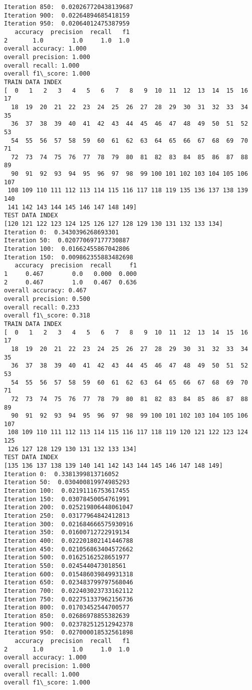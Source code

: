 \documentclass[11pt]{article}
\begin{document}
\begin{Verbatim}[commandchars=\\\{\}]
Iteration 850:  0.020267720438139687
Iteration 900:  0.02264894685418159
Iteration 950:  0.02064012475387959
   accuracy  precision  recall   f1
2       1.0        1.0     1.0  1.0
overall accuracy: 1.000
overall precision: 1.000
overall recall: 1.000
overall f1\_score: 1.000
TRAIN DATA INDEX
[  0   1   2   3   4   5   6   7   8   9  10  11  12  13  14  15  16  17
  18  19  20  21  22  23  24  25  26  27  28  29  30  31  32  33  34  35
  36  37  38  39  40  41  42  43  44  45  46  47  48  49  50  51  52  53
  54  55  56  57  58  59  60  61  62  63  64  65  66  67  68  69  70  71
  72  73  74  75  76  77  78  79  80  81  82  83  84  85  86  87  88  89
  90  91  92  93  94  95  96  97  98  99 100 101 102 103 104 105 106 107
 108 109 110 111 112 113 114 115 116 117 118 119 135 136 137 138 139 140
 141 142 143 144 145 146 147 148 149]
TEST DATA INDEX
[120 121 122 123 124 125 126 127 128 129 130 131 132 133 134]
Iteration 0:  0.3430396268693301
Iteration 50:  0.020770697177730887
Iteration 100:  0.01662455867042806
Iteration 150:  0.009862355883482698
   accuracy  precision  recall     f1
1     0.467        0.0   0.000  0.000
2     0.467        1.0   0.467  0.636
overall accuracy: 0.467
overall precision: 0.500
overall recall: 0.233
overall f1\_score: 0.318
TRAIN DATA INDEX
[  0   1   2   3   4   5   6   7   8   9  10  11  12  13  14  15  16  17
  18  19  20  21  22  23  24  25  26  27  28  29  30  31  32  33  34  35
  36  37  38  39  40  41  42  43  44  45  46  47  48  49  50  51  52  53
  54  55  56  57  58  59  60  61  62  63  64  65  66  67  68  69  70  71
  72  73  74  75  76  77  78  79  80  81  82  83  84  85  86  87  88  89
  90  91  92  93  94  95  96  97  98  99 100 101 102 103 104 105 106 107
 108 109 110 111 112 113 114 115 116 117 118 119 120 121 122 123 124 125
 126 127 128 129 130 131 132 133 134]
TEST DATA INDEX
[135 136 137 138 139 140 141 142 143 144 145 146 147 148 149]
Iteration 0:  0.3381399813716052
Iteration 50:  0.030400819974985293
Iteration 100:  0.02191116753617455
Iteration 150:  0.03078450054761991
Iteration 200:  0.025219806448061047
Iteration 250:  0.03177964842412813
Iteration 300:  0.021684666575930916
Iteration 350:  0.01600712722919134
Iteration 400:  0.022201802141446788
Iteration 450:  0.021056863404572662
Iteration 500:  0.01625162528651977
Iteration 550:  0.0245440473018561
Iteration 600:  0.015486039849931318
Iteration 650:  0.023483799797568046
Iteration 700:  0.022403023733162112
Iteration 750:  0.022751337962156736
Iteration 800:  0.01703452544700577
Iteration 850:  0.02686978855382639
Iteration 900:  0.023782512512942378
Iteration 950:  0.027000018532561898
   accuracy  precision  recall   f1
2       1.0        1.0     1.0  1.0
overall accuracy: 1.000
overall precision: 1.000
overall recall: 1.000
overall f1\_score: 1.000

    \end{Verbatim}
\end{document}

